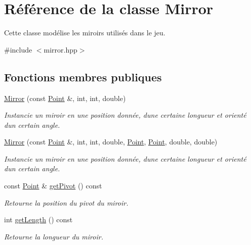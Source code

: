 \hypertarget{classMirror}{}\section{Référence de la classe Mirror}
\label{classMirror}


Cette classe modélise les miroirs utilisés dans le jeu.  




{\ttfamily \#include $<$mirror.\+hpp$>$}

\subsection*{Fonctions membres publiques}
\begin{DoxyCompactItemize}
\item 
\hyperlink{classMirror_aad395af8bb0ef4c68259cc3c694fe663}{Mirror} (const \hyperlink{classPoint}{Point} \&, int, int, double)
\begin{DoxyCompactList}\small\item\em Instancie un miroir en une position donnée, d\textquotesingle{}une certaine longueur et orienté d\textquotesingle{}un certain angle. \end{DoxyCompactList}\item 
\hyperlink{classMirror_afe425460546bb3849fc6a943973e59ef}{Mirror} (const \hyperlink{classPoint}{Point} \&, int, int, double, \hyperlink{classPoint}{Point}, \hyperlink{classPoint}{Point}, double, double)
\begin{DoxyCompactList}\small\item\em Instancie un miroir en une position donnée, d\textquotesingle{}une certaine longueur et orienté d\textquotesingle{}un certain angle. \end{DoxyCompactList}\item 
const \hyperlink{classPoint}{Point} \& \hyperlink{classMirror_a2019420aed1cd71cc5b70ea7f9e0029e}{get\+Pivot} () const 
\begin{DoxyCompactList}\small\item\em Retourne la position du pivot du miroir. \end{DoxyCompactList}\item 
int \hyperlink{classMirror_a10044b17327d12c0fb05b086e98ae4f4}{get\+Length} () const 
\begin{DoxyCompactList}\small\item\em Retourne la longueur du miroir. \end{DoxyCompactList}\item 

\end{DoxyCompactItemize}
